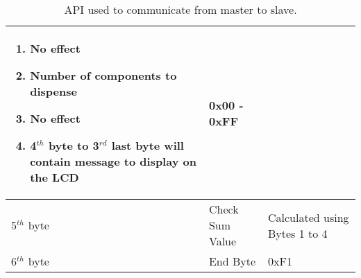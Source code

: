 \documentclass[a4paper,11pt]{article}
\numberwithin{figure}{section}
\numberwithin{table}{section}
\begin{document}
\begin{center}
\begin{table}[ht]
\begin{tabular}{| m{3cm} | m{5cm}| m{5cm} |}
\begin{enumerate}[nosep]
    																			\setlength{\parsep}{0pt} 
																				\item No effect
																				\item Number of components to dispense
																				\item No effect
																				\item 4$^{th}$ byte to 3$^{rd}$ last byte will contain message to display on the LCD
																			\end{enumerate} & 0x00 - 0xFF \\
			\hline
			5$^{th}$ byte & Check Sum Value & Calculated using Bytes 1 to 4 \\
			\hline
			6$^{th}$ byte & End Byte & 0xF1 \\
			\hline
			\end{tabular}
			\caption{API used to communicate from master to slave. \label{tab:M2SAPI}}
		\end{table}
	\end{center}
	\newpage
\end{document}
